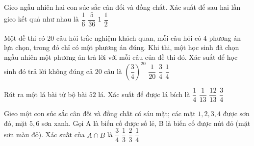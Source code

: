 \begin{ex}%
	Gieo ngẫu nhiên hai con súc sắc cân đối và đồng chất. Xác suất để sau hai lần gieo kết quả như nhau là
	\choice
	{\True $\dfrac{1}{6}$}
	{$\dfrac{5}{36}$}
	{$1$}
	{$\dfrac{1}{2}$}
\end{ex}

\begin{ex}%
	Một đề thi có $20$ câu hỏi trắc nghiệm khách quan, mỗi câu hỏi có $4$ phương án lựa chọn, trong đó chỉ có một phương án đúng. Khi thi, một học sinh đã chọn ngẫu nhiên một phương án trả lời với mỗi câu của đề thi đó. Xác suất để học sinh đó trả lời không đúng cả $20$ câu là
	\choice
	{\True $\left(\dfrac{3}{4}\right)^{20}$}
	{$\dfrac{1}{20}$}
	{$\dfrac{3}{4}$}
	{$\dfrac{1}{4}$}
\end{ex}

\begin{ex}%
	Rút ra một lá bài từ bộ bài $52$ lá. Xác suất để được lá bích là
	\choice
	{\True $\dfrac{1}{4}$}
	{$\dfrac{1}{13}$}
	{$\dfrac{12}{13}$}
	{$\dfrac{3}{4}$}
\end{ex}

\begin{ex}%
	Gieo một con súc sắc cân đối và đồng chất có sáu mặt;  các mặt $1, 2, 3, 4$ được sơn đỏ, mặt $5, 6$ sơn xanh. Gọi A là biến cố được số lẻ, B là biến cố được nút đỏ (mặt sơn màu đỏ). Xác suất của $A \cap B$ là
	\choice
	{$\dfrac{3}{4}$}
	{\True $\dfrac{1}{3}$}
	{$\dfrac{2}{3}$}
	{$\dfrac{1}{4}$}
\end{ex}


